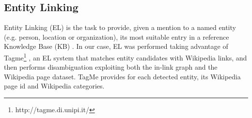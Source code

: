 

\subsection{Entity Linking}\label{sec:disambiguation}

Entity Linking (EL) is the task to provide, given a mention to a named entity (e.g. person, location or organization), its most suitable entry in a reference Knowledge Base (KB) \cite{Moroetal2014b}. %
In our case, EL was performed taking advantage of Tagme\footnote{http://tagme.di.unipi.it/} \cite{Ferragina2012}, an EL system that matches entity candidates with Wikipedia links, and then performs disambiguation exploiting both the in-link graph and the Wikipedia page dataset. %
TagMe provides for each detected entity, its Wikipedia page id and Wikipedia categories.

